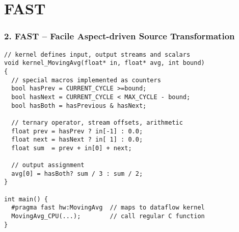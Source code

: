 \section{FAST}

\begin{frame}[fragile]
  \frametitle{2. FAST -- Facile Aspect-driven Source Transformation}

\begin{lstlisting}[style=MaxC]
// kernel defines input, output streams and scalars
void kernel_MovingAvg(float* in, float* avg, int bound)
{
  // special macros implemented as counters
  bool hasPrev = CURRENT_CYCLE >=bound;
  bool hasNext = CURRENT_CYCLE < MAX_CYCLE - bound;
  bool hasBoth = hasPrevious & hasNext;

  // ternary operator, stream offsets, arithmetic
  float prev = hasPrev ? in[-1] : 0.0;
  float next = hasNext ? in[ 1] : 0.0;
  float sum  = prev + in[0] + next;

  // output assignment
  avg[0] = hasBoth? sum / 3 : sum / 2;
}

int main() {
  #pragma fast hw:MovingAvg  // maps to dataflow kernel
  MovingAvg_CPU(...);        // call regular C function
}
\end{lstlisting}
\end{frame}


